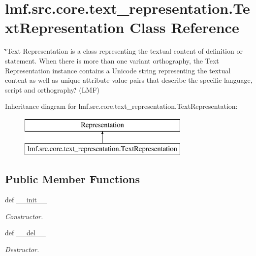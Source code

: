 \hypertarget{classlmf_1_1src_1_1core_1_1text__representation_1_1_text_representation}{\section{lmf.\+src.\+core.\+text\+\_\+representation.\+Text\+Representation Class Reference}
\label{classlmf_1_1src_1_1core_1_1text__representation_1_1_text_representation}
}


\char`\"{}\+Text Representation is a class representing the textual content of definition or statement. When there is more than one variant orthography, the Text Representation instance contains a Unicode string representing the textual content as well as unique attribute-\/value pairs that describe the specific language, script and orthography.\char`\"{} (L\+M\+F)  


Inheritance diagram for lmf.\+src.\+core.\+text\+\_\+representation.\+Text\+Representation\+:\begin{figure}[H]
\begin{center}
\leavevmode
\includegraphics[height=2.000000cm]{classlmf_1_1src_1_1core_1_1text__representation_1_1_text_representation}
\end{center}
\end{figure}
\subsection*{Public Member Functions}
\begin{DoxyCompactItemize}
\item 
def \hyperlink{classlmf_1_1src_1_1core_1_1text__representation_1_1_text_representation_a44896bbde1027d1156df6f3c6396a117}{\+\_\+\+\_\+init\+\_\+\+\_\+}
\begin{DoxyCompactList}\small\item\em Constructor. \end{DoxyCompactList}\item 
def \hyperlink{classlmf_1_1src_1_1core_1_1text__representation_1_1_text_representation_aca36ddfaa299552d8248fd6ce08202a1}{\+\_\+\+\_\+del\+\_\+\+\_\+}
\begin{DoxyCompactList}\small\item\em Destructor. \end{DoxyCompactList}\end{DoxyCompactItemize}
